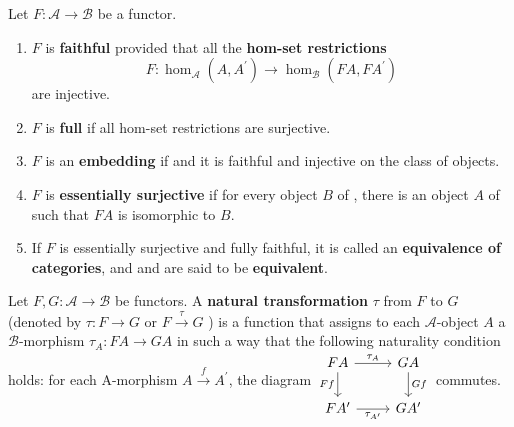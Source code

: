 \noindent Let $F: \mathcal{A} \rightarrow \mathcal{B}$ be a functor.
\begin{enumerate}
    \item $F$ is \textbf{faithful} provided that all the \textbf{hom-set restrictions}
    $$
    F: \operatorname{hom}_{\mathcal{A}}\left(A, A^{\prime}\right) \rightarrow \operatorname{hom}_{\mathcal{B}}\left(F A, F A^{\prime}\right)
    $$
    are injective.
    \item $F$ is \textbf{full} if all hom-set restrictions are surjective.
    \item $F$ is an \textbf{embedding} if and it is faithful and injective on the class of objects.
    \item $F$ is \textbf{essentially surjective} if for every object $B$ of \cb, there is an object $A$ of \ca such that $F A$ is isomorphic to $B$. 
    \item If $F$ is essentially surjective and fully faithful, it is called an \textbf{equivalence of categories}, and \ca and \cb are said to be \textbf{equivalent}.
\end{enumerate}

Let $F, G: \mathcal{A} \rightarrow \mathcal{B}$ be functors. A \textbf{natural transformation} $\tau$ from $F$ to $G$ (denoted by $\tau: F \rightarrow G$ or $F \xrightarrow{\tau} G$ ) is a function that assigns to each $\mathcal{A}$-object $A$ a $\mathcal{B}$-morphism $\tau_A: F A \rightarrow G A$ in such a way that the following naturality condition holds: for each A-morphism $A \xrightarrow{f} A^{\prime}$, the diagram
$
\begin{tikzcd}
FA \arrow[r, "\tau_A"] \arrow[d, "Ff"'] & GA \arrow[d, "Gf"] \\
FA' \arrow[r, "\tau_{A'}"'] & GA'
\end{tikzcd}
$ commutes.\\

